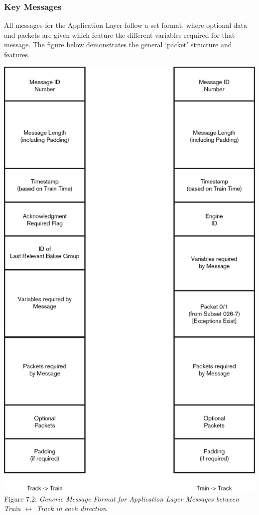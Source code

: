 \documentclass[twoside,11pt,a4paper]{article}
\begin{document}
\subsubsection{Key Messages}
All messages for the Application Layer follow a set format, where optional data and packets are given which feature the different variables required for that message. The figure below demonstrates the general `packet' structure and features.

\begin{center}
 \includegraphics[scale=0.4]{TrainAppMessageFormat.eps}\\
Figure 7.2: \textit{Generic Message Format for Application Layer Messages between Train $\leftrightarrow$ Track in each direction}
\end{center}
\end{document}
